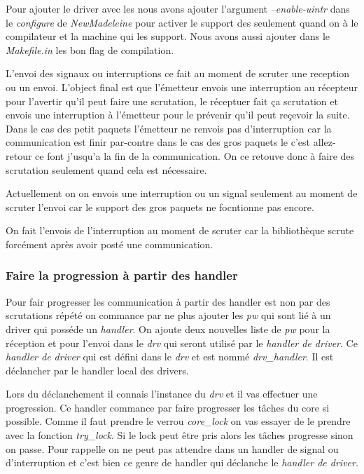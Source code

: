 Pour ajouter le driver avec les \uintr{} nous avons ajouter l'argument \emph{--enable-uintr} dans le \emph{configure} de \emph{NewMadeleine}
pour activer le support des \uintr{} seulement quand on à le compilateur et la machine qui les support.
Nous avons aussi ajouter dans le \emph{Makefile.in} les bon flag de compilation.

L'envoi des signaux ou interruptions ce fait au moment de scruter une reception ou un envoi.
L'object final est que l'émetteur envois une interruption au récepteur pour l'avertir qu'il peut faire une scrutation,
le réceptuer fait ça scrutation et envois une interruption à l'émetteur pour le prévenir qu'il peut reçevoir la suite.
Dans le cas des petit paquets l'émetteur ne renvois pas d'interruption car la communication est finir par-contre
dans le cas des gros paquets le c'est allez-retour ce font j'usqu'a la fin de la communication.
On ce retouve donc à faire des scrutation seulement quand cela est nécessaire.

Actuellement on on envois une interruption ou un signal seulement au moment de scruter l'envoi
car le support des gros paquets ne focntionne pas encore.

On fait l'envois de l'interruption au moment de scruter car la bibliothèque scrute forcément après avoir posté une communication.

\subsubsection{Faire la progression à partir des handler}
\label{progression}

Pour fair progresser les communication à partir des handler est non par des scrutations répété on
commance par ne plus ajouter les \emph{pw} qui sont lié à un driver qui posséde un \emph{handler}.
On ajoute deux nouvelles liste de \emph{pw} pour la réception et pour l'envoi dans le \emph{drv} qui seront utilisé par le \emph{handler de driver}.
Ce \emph{handler de driver} qui est défini dans le \emph{drv} et est nommé \emph{drv_handler}.
Il est déclancher par le handler local des drivers.

Lors du déclanchement il connais l'instance du \emph{drv} et il vas effectuer une progression.
Ce handler commance par faire progresser les tâches du core si possible.
Comme il faut prendre le verrou \emph{core_lock} on vas essayer de le prendre avec la fonction \emph{try_lock}.
Si le lock peut être pris alors les tâches progresse sinon on passe.
Pour rappelle on ne peut pas attendre dans un handler de signal ou d'interruption et c'est bien ce genre de handler qui déclanche
le \emph{handler de driver}.

